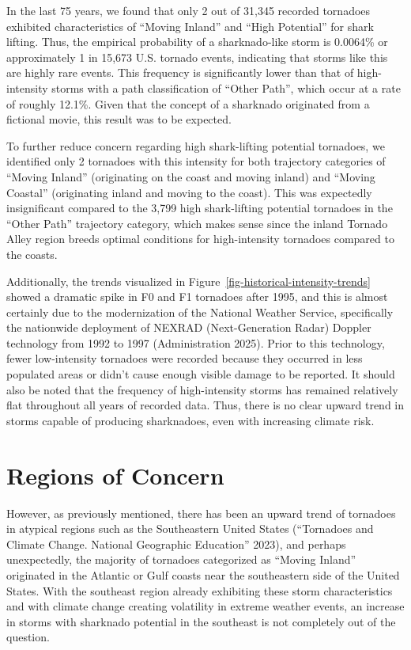 \documentclass[
  letterpaper,
  DIV=11,
  numbers=noendperiod]{scrreprt}
\begin{document}
In the last 75 years, we found that only 2 out of 31,345 recorded
tornadoes exhibited characteristics of ``Moving Inland'' and ``High
Potential'' for shark lifting. Thus, the empirical probability of a
sharknado-like storm is 0.0064\% or approximately 1 in 15,673 U.S.
tornado events, indicating that storms like this are highly rare events.
This frequency is significantly lower than that of high-intensity storms
with a path classification of ``Other Path'', which occur at a rate of
roughly 12.1\%. Given that the concept of a sharknado originated from a
fictional movie, this result was to be expected.

To further reduce concern regarding high shark-lifting potential
tornadoes, we identified only 2 tornadoes with this intensity for both
trajectory categories of ``Moving Inland'' (originating on the coast and
moving inland) and ``Moving Coastal'' (originating inland and moving to
the coast). This was expectedly insignificant compared to the 3,799 high
shark-lifting potential tornadoes in the ``Other Path'' trajectory
category, which makes sense since the inland Tornado Alley region breeds
optimal conditions for high-intensity tornadoes compared to the coasts.

Additionally, the trends visualized in
Figure~\ref{fig-historical-intensity-trends} showed a dramatic spike in
F0 and F1 tornadoes after 1995, and this is almost certainly due to the
modernization of the National Weather Service, specifically the
nationwide deployment of NEXRAD (Next-Generation Radar) Doppler
technology from 1992 to 1997 (Administration 2025). Prior to this
technology, fewer low-intensity tornadoes were recorded because they
occurred in less populated areas or didn't cause enough visible damage
to be reported. It should also be noted that the frequency of
high-intensity storms has remained relatively flat throughout all years
of recorded data. Thus, there is no clear upward trend in storms capable
of producing sharknadoes, even with increasing climate risk.

\section{Regions of Concern}\label{regions-of-concern}

However, as previously mentioned, there has been an upward trend of
tornadoes in atypical regions such as the Southeastern United States
({``Tornadoes and Climate Change. National Geographic Education''}
2023), and perhaps unexpectedly, the majority of tornadoes categorized
as ``Moving Inland'' originated in the Atlantic or Gulf coasts near the
southeastern side of the United States. With the southeast region
already exhibiting these storm characteristics and with climate change
creating volatility in extreme weather events, an increase in storms
with sharknado potential in the southeast is not completely out of the
question.
\end{document}
